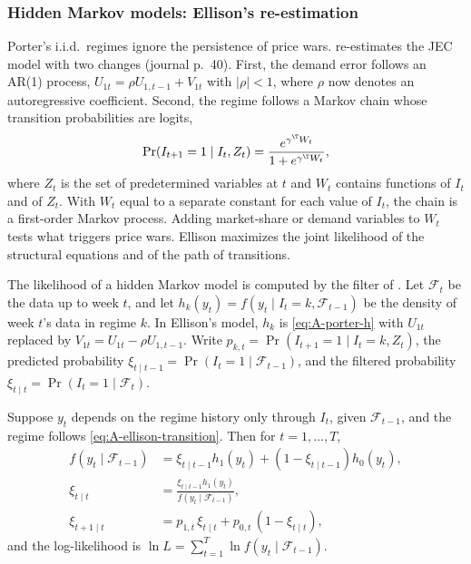 \subsubsection*{Hidden Markov models: Ellison's re-estimation}

Porter's i.i.d.\ regimes ignore the persistence of price wars. \citet{Ellison1994} re-estimates the JEC model with two
changes (journal p.~40). First, the demand error follows an AR(1) process, $U_{1t} = \rho U_{1,t-1} + V_{1t}$ with
$\lvert\rho\rvert < 1$, where $\rho$ now denotes an autoregressive coefficient. Second, the regime follows a Markov chain whose
transition probabilities are logits,
\begin{equation}\label{eq:A-ellison-transition}
  \Pr(I_{t+1} = 1 \mid I_t, Z_t) = \frac{e^{\gamma^\T W_t}}{1 + e^{\gamma^\T W_t}},
\end{equation}
where $Z_t$ is the set of predetermined variables at $t$ and $W_t$ contains functions of $I_t$ and of $Z_t$. With $W_t$
equal to a separate constant for each value of $I_t$, the chain is a first-order Markov process. Adding market-share or
demand variables to $W_t$ tests what triggers price wars. Ellison maximizes the joint likelihood of the structural
equations and of the path of transitions.

The likelihood of a hidden Markov model is computed by the filter of \citet{Hamilton1989}. Let $\mathcal{F}_t$ be the data
up to week $t$, and let $h_k(y_t) = f(y_t \mid I_t = k, \mathcal{F}_{t-1})$ be the density of week $t$'s data in regime $k$.
In Ellison's model, $h_k$ is \eqref{eq:A-porter-h} with $U_{1t}$ replaced by $V_{1t} = U_{1t} - \rho U_{1,t-1}$. Write
$p_{k,t} = \Pr(I_{t+1} = 1 \mid I_t = k, Z_t)$, the predicted probability $\xi_{t \mid t-1} = \Pr(I_t = 1 \mid \mathcal{F}_{t-1})$,
and the filtered probability $\xi_{t \mid t} = \Pr(I_t = 1 \mid \mathcal{F}_t)$.

\begin{proposition}\label{prop:A-hamilton}
Suppose $y_t$ depends on the regime history only through $I_t$, given $\mathcal{F}_{t-1}$, and the regime follows
\eqref{eq:A-ellison-transition}. Then for $t = 1, \dots, T$,
\begin{align}
  f(y_t \mid \mathcal{F}_{t-1}) &= \xi_{t \mid t-1}h_1(y_t) + (1 - \xi_{t \mid t-1})h_0(y_t),\label{eq:A-ham-pred}\\
  \xi_{t \mid t} &= \frac{\xi_{t \mid t-1}h_1(y_t)}{f(y_t \mid \mathcal{F}_{t-1})},\label{eq:A-ham-update}\\
  \xi_{t+1 \mid t} &= p_{1,t}\,\xi_{t \mid t} + p_{0,t}\,(1 - \xi_{t \mid t}),\label{eq:A-ham-forecast}
\end{align}
and the log-likelihood is $\ln L = \sum_{t=1}^T\ln f(y_t \mid \mathcal{F}_{t-1})$.
\end{proposition}

